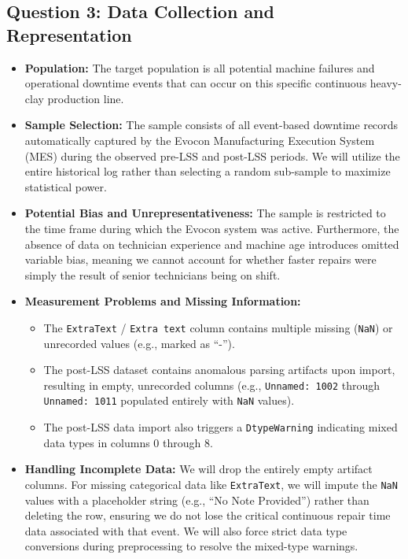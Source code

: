 \subsection*{Question 3: Data Collection and Representation}
\begin{itemize}
    \item \textbf{Population:} The target population is all potential machine failures and operational downtime events that can occur on this specific continuous heavy-clay production line.
    \item \textbf{Sample Selection:} The sample consists of all event-based downtime records automatically captured by the Evocon Manufacturing Execution System (MES) during the observed pre-LSS and post-LSS periods. We will utilize the entire historical log rather than selecting a random sub-sample to maximize statistical power.
    \item \textbf{Potential Bias and Unrepresentativeness:} The sample is restricted to the time frame during which the Evocon system was active. Furthermore, the absence of data on technician experience and machine age introduces omitted variable bias, meaning we cannot account for whether faster repairs were simply the result of senior technicians being on shift.
    \item \textbf{Measurement Problems and Missing Information:}
    \begin{itemize}
        \item The \texttt{ExtraText} / \texttt{Extra text} column contains multiple missing (\texttt{NaN}) or unrecorded values (e.g., marked as ``-'').
        \item The post-LSS dataset contains anomalous parsing artifacts upon import, resulting in empty, unrecorded columns (e.g., \texttt{Unnamed: 1002} through \texttt{Unnamed: 1011} populated entirely with \texttt{NaN} values).
        \item The post-LSS data import also triggers a \texttt{DtypeWarning} indicating mixed data types in columns 0 through 8.
    \end{itemize}
    \item \textbf{Handling Incomplete Data:} We will drop the entirely empty artifact columns. For missing categorical data like \texttt{ExtraText}, we will impute the \texttt{NaN} values with a placeholder string (e.g., ``No Note Provided'') rather than deleting the row, ensuring we do not lose the critical continuous repair time data associated with that event. We will also force strict data type conversions during preprocessing to resolve the mixed-type warnings.
\end{itemize}